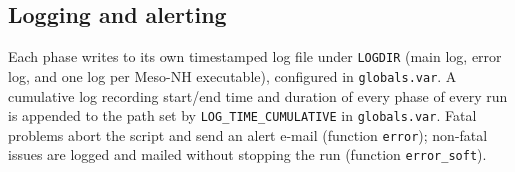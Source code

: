 \subsection{Logging and alerting}
Each phase writes to its own timestamped log file under \texttt{LOGDIR} (main log, error log, and one
log per Meso-NH executable), configured in \texttt{globals.var}. A cumulative log recording start/end
time and duration of every phase of every run is appended to the path set by
\texttt{LOG\_TIME\_CUMULATIVE} in \texttt{globals.var}. Fatal problems abort the script and send an
alert e-mail (function \texttt{error}); non-fatal issues are logged and mailed without stopping the run
(function \texttt{error\_soft}).

